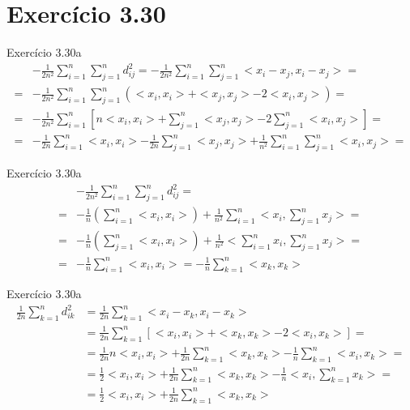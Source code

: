 \documentclass{beamer}
\begin{document}
\section{Exerc\'icio 3.30}
\begin{frame}{Exerc\'icio 3.30a}
  \begin{align}
    &-\frac{1}{2n^2} \sum_{i = 1}^{n} \sum_{j = 1}^{n} d_{ij}^2 = -\frac{1}{2n^2} \sum_{i = 1}^{n} \sum_{j = 1}^{n} <x_i - x_j, x_i - x_j> = \\ \nonumber
    = &-\frac{1}{2n^2} \sum_{i = 1}^{n} \sum_{j = 1}^{n} \left( <x_i, x_i> + <x_j, x_j> - 2<x_i, x_j> \right) = \\ \nonumber
    = &-\frac{1}{2n^2} \sum_{i = 1}^{n} \left[ n <x_i, x_i> + \sum_{j = 1}^{n} <x_j, x_j> - 2 \sum_{j = 1}^{n} <x_i, x_j> \right] = \\ \nonumber
    = &-\frac{1}{2n} \sum_{i = 1}^{n} <x_i, x_i> - \frac{1}{2n} \sum_{j = 1}^{n} <x_j, x_j> + \frac{1}{n^2} \sum_{i = 1}^{n} \sum_{j = 1}^{n} <x_i, x_j> =
  \end{align}
\end{frame}

\begin{frame}{Exerc\'icio 3.30a}
  \begin{align*}
    &-\frac{1}{2n^2} \sum_{i = 1}^{n} \sum_{j = 1}^{n} d_{ij}^2 = \\ \nonumber
    = &-\frac{1}{n} \left( \sum_{i = 1}^{n} <x_i, x_i> \right) + \frac{1}{n^2} \sum_{i = 1}^{n} <x_i, \sum_{j = 1}^{n} x_j> = \\ \nonumber
    = &-\frac{1}{n} \left( \sum_{j = 1}^{n} <x_i, x_i> \right) + \frac{1}{n^2} <\sum_{i = 1}^{n} x_i, \sum_{j = 1}^{n} x_j> = \\ \nonumber
    = &-\frac{1}{n} \sum_{i = 1}^{n} <x_i, x_i> = -\frac{1}{n} \sum_{k = 1}^{n} <x_k, x_k>
  \end{align*}
\end{frame}

\begin{frame}{Exerc\'icio 3.30a}
  \begin{align}
    \frac{1}{2n} \sum_{k = 1}^{n} d_{ik}^2 &= \frac{1}{2n} \sum_{k = 1}^{n} <x_i - x_k, x_i - x_k>  \\ \nonumber
    &= \frac{1}{2n} \sum_{k = 1}^{n} \left[ <x_i, x_i> + <x_k, x_k> - 2 <x_i, x_k> \right] = \\ \nonumber
    &= \frac{1}{2n} n <x_i, x_i> + \frac{1}{2n} \sum_{k = 1}^{n} <x_k, x_k> - \frac{1}{n} \sum_{k = 1}^{n} <x_i, x_k> = \\ \nonumber
    &= \frac{1}{2} <x_i, x_i> + \frac{1}{2n} \sum_{k = 1}^{n} <x_k, x_k> - \frac{1}{n} <x_i, \sum_{k = 1}^{n} x_k> = \\ \nonumber
    &= \frac{1}{2} <x_i, x_i> + \frac{1}{2n} \sum_{k = 1}^{n} <x_k, x_k>
  \end{align}
\end{frame}
\end{document}
